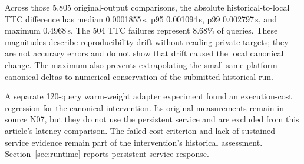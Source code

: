 Across those 5,805 original-output comparisons, the absolute historical-to-local TTC difference has median 0.0001855\,s, p95 0.001094\,s, p99 0.002797\,s, and maximum 0.4968\,s. The 504 TTC failures represent 8.68\% of queries. These magnitudes describe reproducibility drift without reading private targets; they are not accuracy errors and do not show that drift caused the local canonical change. The maximum also prevents extrapolating the small same-platform canonical deltas to numerical conservation of the submitted historical run. 

A separate 120-query warm-weight adapter experiment found an execution-cost regression for the canonical intervention. Its original measurements remain in source N07, but they do not use the persistent service and are excluded from this article's latency comparison. The failed cost criterion and lack of sustained-service evidence remain part of the intervention's historical assessment. Section~\ref{sec:runtime} reports persistent-service response.
\FloatBarrier

